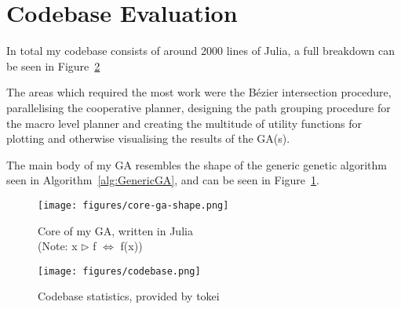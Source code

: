 \section{Codebase Evaluation}

In total my codebase consists of around 2000 lines of Julia, a full breakdown can be seen in Figure~\ref{fig:codebase}

The areas which required the most work were the Bézier intersection procedure, parallelising the cooperative planner, designing the path grouping procedure for the macro level planner and creating the multitude of utility functions for plotting and otherwise visualising the results of the GA(s).

The main body of my GA resembles the shape of the generic genetic algorithm seen in Algorithm~\ref{alg:GenericGA}, and can be seen in Figure~\ref{fig:core-ga}.


\begin{figure}[ht]
  \centering
  \texttt{[image: figures/core-ga-shape.png]}
  \caption{\label{fig:core-ga} Core of my GA, written in Julia \\ \small (Note: x $\rhd$ f $\Leftrightarrow$ f(x))}
\end{figure}



\begin{figure}[ht]
  \centering
  \texttt{[image: figures/codebase.png]}
  \caption{\label{fig:codebase} Codebase statistics, provided by tokei}
\end{figure}



